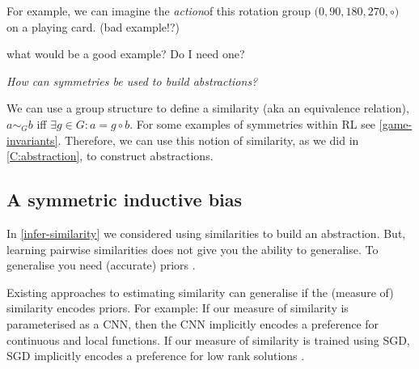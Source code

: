 For example, we can imagine the \textit{action}\footnotemark of this rotation group $\big(0, 90, 180, 270, \circ \big)$ on a playing card. (bad example!?)



{\color{red}what would be a good example? Do I need one?}

\begin{displayquote}
\textsl{How can symmetries be used to build abstractions?}
\end{displayquote}

We can use a group structure to define a similarity (aka an equivalence relation),
$a \sim_G b$ iff $\exists g \in G: a = g \circ b$. For some examples of symmetries within RL see \ref{game-invariants}.
Therefore, we can use this notion of similarity, as we did in \ref{C:abstraction}, to construct abstractions.


\subsection{A symmetric inductive bias}


In \ref{infer-similarity} we considered using similarities
to build an abstraction. But, learning pairwise similarities does not give
you the ability to generalise\footnotemark. To generalise you need (accurate) priors \cite{Wolpert1996}.


Existing approaches to estimating similarity can generalise if the (measure of) similarity encodes priors.
For example:
If our measure of similarity is parameterised as a CNN, then the CNN implicitly encodes a preference for continuous and local functions\cite{Yann1995}.
If our measure of similarity is trained using SGD, SGD implicitly encodes a preference for low rank solutions \cite{Gunasekar2017}.

